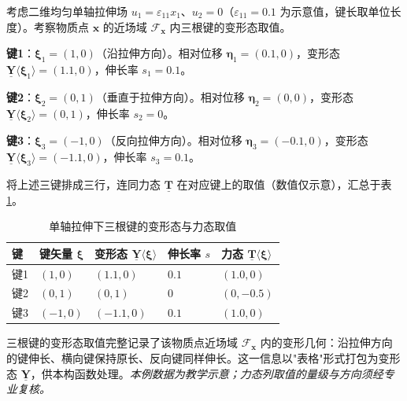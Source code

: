 \begin{example}[单轴拉伸下三根键的变形态与力态取值]
  考虑二维均匀单轴拉伸场 $u_1=\varepsilon_{11}x_1$、$u_2=0$（$\varepsilon_{11}=0.1$ 为示意值，键长取单位长度）。考察物质点 $\mathbf{x}$ 的近场域 $\mathcal{F}_{\mathbf{x}}$ 内三根键的变形态取值。

  \textbf{键1}：$\boldsymbol{\xi}_1=(1,0)$（沿拉伸方向）。相对位移 $\boldsymbol{\eta}_1=(0.1,0)$，变形态 $\underline{\mathbf{Y}}\langle\boldsymbol{\xi}_1\rangle=(1.1,0)$，伸长率 $s_1=0.1$。

  \textbf{键2}：$\boldsymbol{\xi}_2=(0,1)$（垂直于拉伸方向）。相对位移 $\boldsymbol{\eta}_2=(0,0)$，变形态 $\underline{\mathbf{Y}}\langle\boldsymbol{\xi}_2\rangle=(0,1)$，伸长率 $s_2=0$。

  \textbf{键3}：$\boldsymbol{\xi}_3=(-1,0)$（反向拉伸方向）。相对位移 $\boldsymbol{\eta}_3=(-0.1,0)$，变形态 $\underline{\mathbf{Y}}\langle\boldsymbol{\xi}_3\rangle=(-1.1,0)$，伸长率 $s_3=0.1$。

  将上述三键排成三行，连同力态 $\underline{\mathbf{T}}$ 在对应键上的取值（数值仅示意），汇总于表\ref{tab:state-yt-data}。

  \begin{table}[htbp]
    \centering
    \small
    \caption{单轴拉伸下三根键的变形态与力态取值}
    \label{tab:state-yt-data}
    \begin{tabular}{>{\raggedright\arraybackslash}p{}>{\raggedright\arraybackslash}p{}>{\raggedright\arraybackslash}p{}>{\raggedright\arraybackslash}p{}>{\raggedright\arraybackslash}p{}}
      \toprule
      键 & 键矢量 $\boldsymbol{\xi}$ & 变形态 $\underline{\mathbf{Y}}\langle\boldsymbol{\xi}\rangle$ & 伸长率 $s$ & 力态 $\underline{\mathbf{T}}\langle\boldsymbol{\xi}\rangle$ \\
      \midrule
      键1 & $(1,0)$ & $(1.1,0)$ & $0.1$ & $(1.0,0)$ \\
      键2 & $(0,1)$ & $(0,1)$ & $0$ & $(0,-0.5)$ \\
      键3 & $(-1,0)$ & $(-1.1,0)$ & $0.1$ & $(1.0,0)$ \\
      \bottomrule
    \end{tabular}
  \end{table}

  三根键的变形态取值完整记录了该物质点近场域 $\mathcal{F}_{\mathbf{x}}$ 内的变形几何：沿拉伸方向的键伸长、横向键保持原长、反向键同样伸长。这一信息以"表格"形式打包为变形态 $\underline{\mathbf{Y}}$，供本构函数处理。\emph{本例数据为教学示意；力态列取值的量级与方向须经专业复核。}
\end{example}


